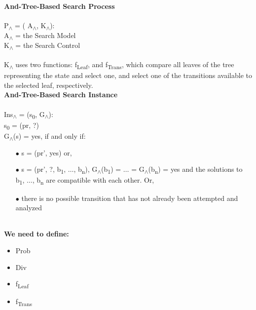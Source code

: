 \documentclass[10pt, oneside]{article}   	%
\begin{document}
\noindent \textbf{And-Tree-Based Search Process}\\\\
P\textsubscript{$\land$} = ( A\textsubscript{$\land$}, K\textsubscript{$\land$}):\\
\indent A\textsubscript{$\land$} = the Search Model\\
\indent K\textsubscript{$\land$} = the Search Control\\\\
\noindent K\textsubscript{$\land$} uses two functions: f\textsubscript{Leaf}, and f\textsubscript{Trans}, which compare all leaves of the tree representing the state and select one, and select one of the transitions available to the selected leaf, respectively.\\

\noindent \textbf{And-Tree-Based Search Instance}\\\\
Ins\textsubscript{$\land$} = (s\textsubscript{0}, G\textsubscript{$\land$}):\\
\indent s\textsubscript{0} = (pr, ?)\\
\indent G\textsubscript{$\land$}(s) = yes, if and only if:
\begin{enumerate}[leftmargin=25mm,topsep=0pt]
\item[$\bullet$] s = (pr', yes) or,
\item[$\bullet$] s = (pr', ?, b\textsubscript{1}, $\ldots$, b\textsubscript{n}), G\textsubscript{$\land$}(b\textsubscript{1}) = $\ldots$ = G\textsubscript{$\land$}(b\textsubscript{n}) = yes and the solutions to b\textsubscript{1}, $\ldots$, b\textsubscript{n} are compatible with each other. Or,
\item[$\bullet$] there is no possible transition that has not already been attempted and analyzed
\end{enumerate}

\noindent \textbf{\\We need to define:}
\begin{itemize}[topsep=0pt]
\item Prob
\item Div
\item f\textsubscript{Leaf}
\item f\textsubscript{Trans}
\end{itemize}
\end{document}
